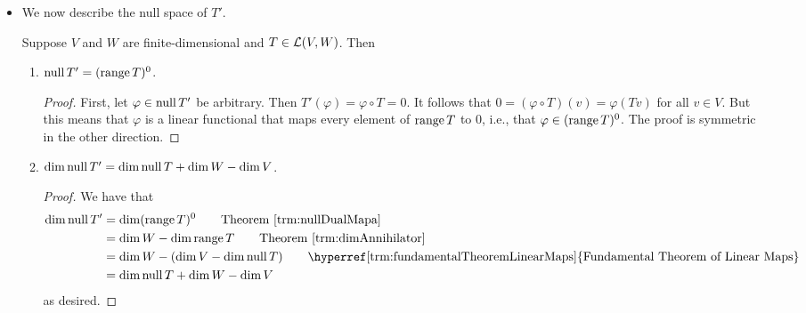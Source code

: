 \documentclass[../main.tex]{subfiles}
\begin{document}
\begin{itemize}
\begin{theorem}
\begin{proof}
            Thus, $i'(\psi)=\psi\circ i=\varphi$. It follows that $\varphi\in\range i'$. Consequently, $\range i'=U'$, so $\dim U=\dim U'=\dim\range i'$ by Theorem \ref{trm:dimDualSpace}. Therefore, we have from the first equation and the three substitutions that
            \begin{equation*}
                \dim U+\dim U^0 = \dim V
            \end{equation*}
            as desired.\footnote{Note that we may also prove this by constructing a basis of $U$ extending it to a basis of $V$, and showing that the extended portion of the dual basis is a basis of $U^0$.}
        \end{proof}
    \end{theorem}
    \item We now describe the null space of $T'$.
    \begin{theorem}\label{trm:nullDualMap}
        Suppose $V$ and $W$ are finite-dimensional and $T\in\mathcal{L}(V,W)$. Then
        \begin{enumerate}[label={\textup{(}\alph*\textup{)}},ref={\thetheorem\alph*}]
            \item \label{trm:nullDualMapa}$\operatorname{null} T'=(\operatorname{range} T)^0$.
            \begin{proof}
                First, let $\varphi\in\operatorname{null} T'$ be arbitrary. Then $T'(\varphi)=\varphi\circ T=0$. It follows that $0=(\varphi\circ T)(v)=\varphi(Tv)$ for all $v\in V$. But this means that $\varphi$ is a linear functional that maps every element of $\operatorname{range} T$ to 0, i.e., that $\varphi\in(\operatorname{range} T)^0$. The proof is symmetric in the other direction.
            \end{proof}
            \item \label{trm:nullDualMapb}$\dim\operatorname{null} T'=\dim\operatorname{null} T+\dim W-\dim V$.
            \begin{proof}
                We have that
                \begin{align*}
                    \dim\nul T' &= \dim(\range T)^0\tag*{Theorem \ref{trm:nullDualMapa}}\\
                    &= \dim W-\dim\range T\tag*{Theorem \ref{trm:dimAnnihilator}}\\
                    &= \dim W-(\dim V-\dim\nul T)\tag*{\hyperref[trm:fundamentalTheoremLinearMaps]{Fundamental Theorem of Linear Maps}}\\
                    &= \dim\nul T+\dim W-\dim V
                \end{align*}
                as desired.
            \end{proof}

\end{enumerate}
\end{theorem}
\end{itemize}
\end{document}
